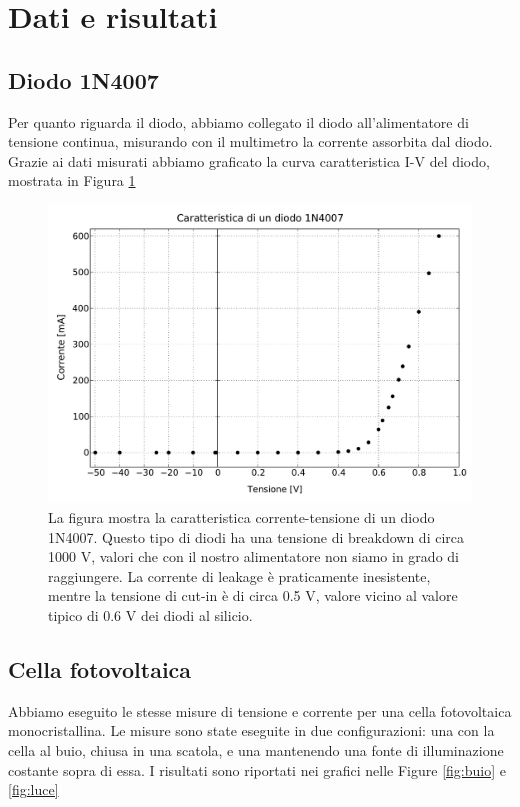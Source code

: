 \section*{Dati e risultati}

\subsection*{Diodo 1N4007}

Per quanto riguarda il diodo, abbiamo collegato il diodo all'alimentatore di tensione continua,
misurando con il multimetro la corrente assorbita dal diodo. Grazie ai dati misurati abbiamo graficato
la curva caratteristica I-V del diodo, mostrata in Figura \ref{fig:diodo}

\begin{figure}
    \includegraphics[scale=0.50]{diodo.pdf}
    \caption{La figura mostra la caratteristica corrente-tensione di un diodo 1N4007. Questo tipo di diodi
        ha una tensione di breakdown di circa 1000 V, valori che con il nostro alimentatore non siamo in grado di raggiungere.
        La corrente di leakage è praticamente inesistente, mentre la tensione di cut-in è di circa 0.5 V, valore vicino al valore
        tipico di 0.6 V dei diodi al silicio. }
    \label{fig:diodo}
\end{figure}

\subsection*{Cella fotovoltaica}

Abbiamo eseguito le stesse misure di tensione e corrente per una cella fotovoltaica monocristallina. Le misure sono state
eseguite in due configurazioni: una con la cella al buio, chiusa in una scatola, e una mantenendo una fonte di illuminazione costante
sopra di essa. I risultati sono riportati nei grafici nelle Figure \ref{fig:buio} e \ref{fig:luce}

